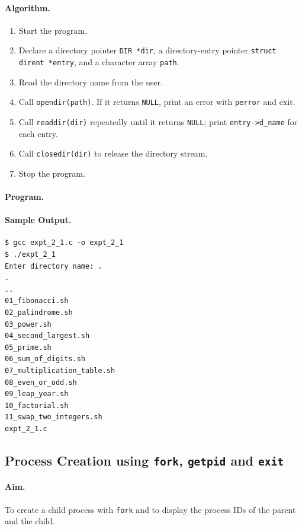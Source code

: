 \paragraph{Algorithm.}
\begin{enumerate}
    \item Start the program.
    \item Declare a directory pointer \texttt{DIR *dir}, a directory-entry pointer \texttt{struct dirent *entry}, and a character array \texttt{path}.
    \item Read the directory name from the user.
    \item Call \texttt{opendir(path)}. If it returns \texttt{NULL}, print an error with \texttt{perror} and exit.
    \item Call \texttt{readdir(dir)} repeatedly until it returns \texttt{NULL}; print \texttt{entry->d\_name} for each entry.
    \item Call \texttt{closedir(dir)} to release the directory stream.
    \item Stop the program.
\end{enumerate}

\paragraph{Program.}


\paragraph{Sample Output.}
\begin{lstlisting}[style=outputstyle, caption={Listing the contents of the current directory}]
$ gcc expt_2_1.c -o expt_2_1
$ ./expt_2_1
Enter directory name: .
.
..
01_fibonacci.sh
02_palindrome.sh
03_power.sh
04_second_largest.sh
05_prime.sh
06_sum_of_digits.sh
07_multiplication_table.sh
08_even_or_odd.sh
09_leap_year.sh
10_factorial.sh
11_swap_two_integers.sh
expt_2_1.c
\end{lstlisting}

\subsection{Process Creation using \texttt{fork}, \texttt{getpid} and \texttt{exit}}

\paragraph{Aim.}
To create a child process with \texttt{fork} and to display the process IDs of the parent and the child.

